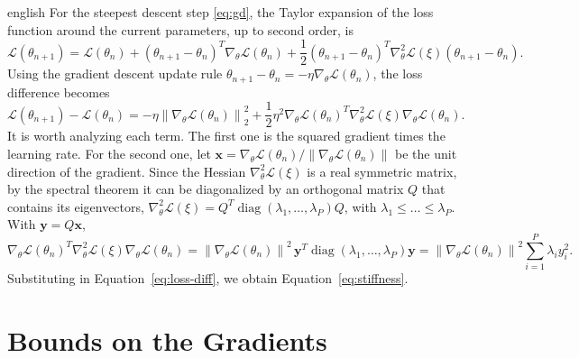 \documentclass[11pt,letterpaper,twoside,openright]{book} %
\newcommand{\norm}[1]{\left\lVert #1 \right\rVert}
\newcommand{\Loss}{\mathcal{L}}
\DeclareMathOperator{\diag}{diag}
\begin{document}
\begin{hyphenrules}{english}
For the steepest descent step \eqref{eq:gd}, the Taylor expansion of the loss function around the
current parameters, up to second order, is
\begin{equation}
  \Loss(\theta_{n+1})=\Loss(\theta_n)+(\theta_{n+1}-\theta_n)^{T}\nabla_\theta\Loss(\theta_n)
  +\frac12(\theta_{n+1}-\theta_n)^{T}\nabla^2_\theta\Loss(\xi)(\theta_{n+1}-\theta_n).
  \label{eq:taylor}
\end{equation}
Using the gradient descent update rule $\theta_{n+1}-\theta_n=-\eta\nabla_\theta\Loss(\theta_n)$, the
loss difference becomes
\begin{equation}
  \Loss(\theta_{n+1})-\Loss(\theta_n)=-\eta\norm{\nabla_\theta\Loss(\theta_n)}_2^2
  +\frac12\eta^2\nabla_\theta\Loss(\theta_n)^{T}\nabla^2_\theta\Loss(\xi)\nabla_\theta\Loss(\theta_n).
  \label{eq:loss-diff}
\end{equation}
It is worth analyzing each term. The first one is the squared gradient times the learning rate. For the
second one, let $\mathbf{x}=\nabla_\theta\Loss(\theta_n)/\norm{\nabla_\theta\Loss(\theta_n)}$ be the unit
direction of the gradient. Since the Hessian $\nabla^2_\theta\Loss(\xi)$ is a real symmetric matrix, by the
spectral theorem \cite{trefethen1997} it can be diagonalized by an orthogonal matrix $Q$ that contains
its eigenvectors, $\nabla^2_\theta\Loss(\xi)=Q^{T}\diag(\lambda_1,\dots,\lambda_P)Q$, with
$\lambda_1\le\dots\le\lambda_P$. With $\mathbf{y}=Q\mathbf{x}$,
\begin{equation}
  \nabla_\theta\Loss(\theta_n)^{T}\nabla^2_\theta\Loss(\xi)\nabla_\theta\Loss(\theta_n)
  =\norm{\nabla_\theta\Loss(\theta_n)}^2\,\mathbf{y}^{T}\diag(\lambda_1,\dots,\lambda_P)\mathbf{y}
  =\norm{\nabla_\theta\Loss(\theta_n)}^2\sum_{i=1}^{P}\lambda_iy_i^2.
  \label{eq:hessian-quadratic}
\end{equation}
Substituting in Equation~\eqref{eq:loss-diff}, we obtain Equation~\eqref{eq:stiffness}.

\section{Bounds on the Gradients}\label{app-sec:grad-bounds}


\end{hyphenrules}
\end{document}
